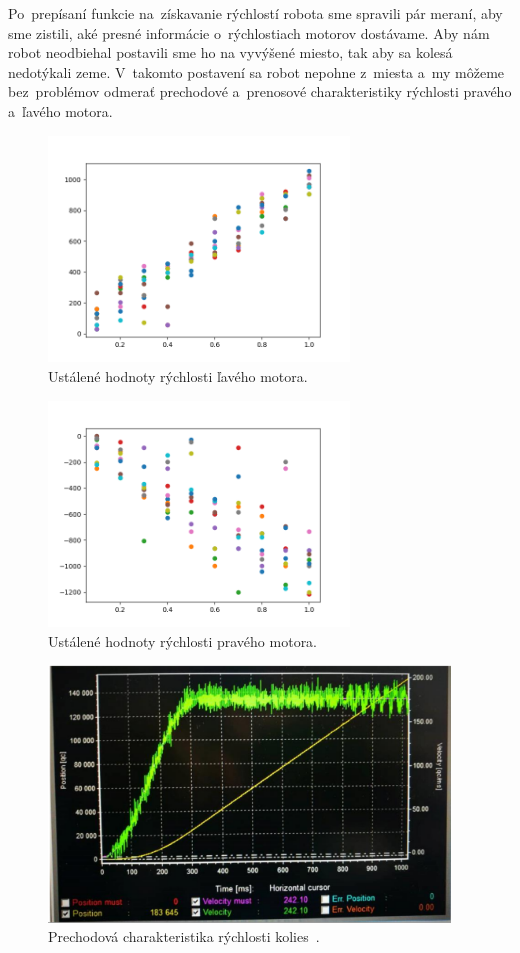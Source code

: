 Po~prepísaní funkcie na~získavanie rýchlostí robota sme spravili pár meraní, aby sme zistili, aké presné informácie o~rýchlostiach
motorov dostávame. Aby nám robot neodbiehal postavili sme ho na vyvýšené miesto, tak aby sa kolesá nedotýkali zeme. V~takomto
postavení sa robot nepohne z~miesta a~my môžeme bez~problémov odmerať prechodové a~prenosové charakteristiky rýchlosti pravého
a~ľavého motora.

\begin{figure}[!htbp]
	\begin{center}
		\includegraphics[width=8cm]{img/Left_wheel.png}
	\end{center}
	\caption{Ustálené hodnoty rýchlosti ľavého motora. }
	\label{fig:laveKoleso}
\end{figure}

\begin{figure}[!htbp]
	\begin{center}
		\includegraphics[width=8cm]{img/Right_wheel.png}
	\end{center}
	\caption{Ustálené hodnoty rýchlosti pravého motora. }
	\label{fig:praveKoleso}
\end{figure}

\begin{figure}[!htbp]
	\begin{center}
		\includegraphics[width=0.95\textwidth]{img/robotSpeedChar.png}
	\end{center}
	\caption{Prechodová charakteristika rýchlosti kolies~\cite{timovyProjekt}. }
	\label{fig:prechChar}
\end{figure}

